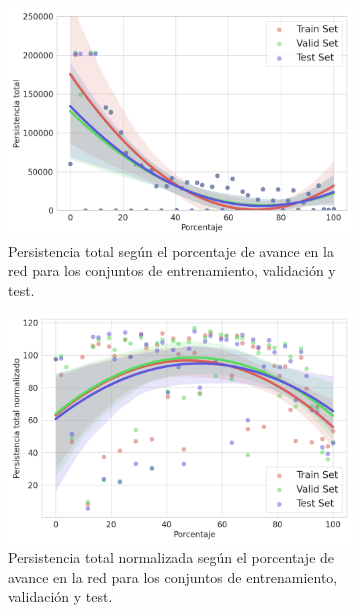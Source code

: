 \begin{figure}[H]
	\centering
	\begin{subfigure}
		{.45\textwidth}
		\centering
		\includegraphics[width=\linewidth]{img/m_set_base.png}
		\caption{Persistencia total según el porcentaje de avance en la red para los
			conjuntos de entrenamiento, validación y test.}
		\label{fig:m_set_base}
	\end{subfigure}
	\begin{subfigure}
		{.45\textwidth}
		\centering
		\includegraphics[width=\linewidth]{img/m_set_base_norm.png}
		\caption{Persistencia total normalizada según el porcentaje de avance en la
			red para los conjuntos de entrenamiento, validación y test.}
		\label{fig:m_set_base_norm}
	\end{subfigure}
	\begin{subfigure}
		{.45\textwidth}
		\centering

\end{subfigure}
\end{figure}
